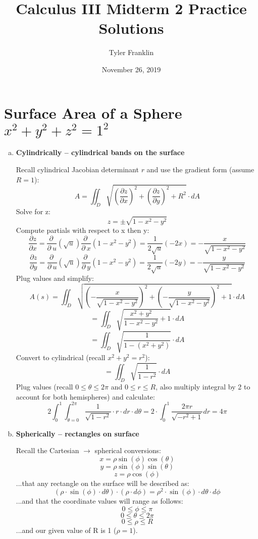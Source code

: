 \documentclass{article}
\title{Calculus III Midterm 2 Practice Solutions}
\author{Tyler Franklin}
\date{November 26, 2019}
\begin{document}
\maketitle

\section{Surface Area of a Sphere $x^2 + y^2 + z^2 = 1^2$ }
\begin{enumerate}[a.]
	\item \textbf{Cylindrically -- cylindrical bands on the surface }

            Recall cylindrical Jacobian determinant $ r $ and use the gradient form (assume $R = 1$):
            \[ A = \iint_{D}\sqrt{ (\frac{\partial z}{\partial x})^2 + (\frac{\partial z}{\partial y})^2 + R^2 } \cdot dA \]
            Solve for z:
            \[ z = \pm\sqrt{1-x^{2}-y^{2}} \]
            Compute partials with respect to x then y:
            \[ \frac{\partial z}{\partial x} = \frac{\partial \:}{\partial \:u}\left(\sqrt{u}\right)\frac{\partial \:}{\partial \:x}\left(1-x^2-y^2\right) = \frac{1}{2\sqrt{u}}\left(-2x\right) = -\frac{x}{\sqrt{1-x^2-y^2}} \]
            \[ \frac{\partial z}{\partial y} = \frac{\partial \:}{\partial \:u}\left(\sqrt{u}\right)\frac{\partial \:}{\partial \:y}\left(1-x^2-y^2\right) = \frac{1}{2\sqrt{u}}\left(-2y\right) = -\frac{y}{\sqrt{1-x^2-y^2}} \]
            Plug values and simplify:
            \[ A(s) = \iint_{D}\sqrt{\left(-\frac{x}{\sqrt{1-x^2-y^2}}\right)^2+\left(-\frac{y}{\sqrt{1-x^2-y^2}}\right)^2+1}  \cdot dA \]
            \[ = \iint_{D}\sqrt{\frac{x^2+y^2}{1-x^2-y^2}+1}  \cdot dA \]
            \[ = \iint_{D}\sqrt{\frac{1}{1-(x^2+y^2)}}  \cdot dA \]
            Convert to cylindrical (recall $x^2 + y^2 = r^2$):
            \[ = \iint_{D}\sqrt{\frac{1}{1-r^2}}  \cdot dA \]
            Plug values (recall $0 \leq \theta \leq 2\pi $ and $0 \leq r \leq R $, also multiply integral by 2 to account for both hemispheres) and calculate:
            \[ 2\int_{0}^{1}\int_{\theta=0}^{2\pi} \frac{1}{\sqrt{1-r^2}}\cdot r \cdot dr \cdot d\theta = 2\cdot \int _0^1\frac{2\pi r}{\sqrt{-r^2+1}}dr = 4\pi \]

	\item \textbf{Spherically -- rectangles on surface}

            Recall the Cartesian $\rightarrow$ spherical conversions:
            \[ x = \rho\sin(\phi)\cos(\theta)   \]
            \[ y = \rho\sin(\phi)\sin(\theta)  \]
            \[ z = \rho\cos(\phi)  \]
            ...that any rectangle on the surface will be described as:
            \[ (\rho\cdot\sin(\phi)\cdot d \theta)\cdot(\rho\cdot d \phi) = \rho^2\cdot\sin(\phi)\cdot d\theta\cdot d\phi \]
            ...and that the coordinate values will range as follows:
            \[ 0 \leq \phi \leq \pi  \]
            \[ 0 \leq \theta \leq 2\pi  \]
            \[ 0 \leq \rho \leq R \]
            ...and our given value of R is 1 ($\rho = 1$).


\end{enumerate}
\end{document}
